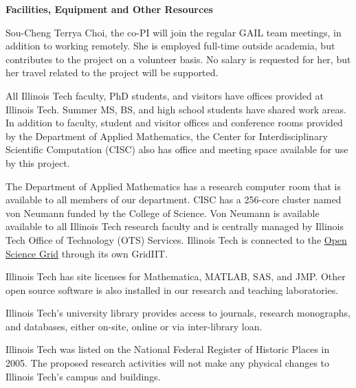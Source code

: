 \documentclass[11pt]{NSFamsart}
\begin{document}

\centerline{\textbf{\Large Facilities, Equipment and Other Resources}}

\bigskip

Sou-Cheng Terrya Choi, the co-PI will join the regular GAIL team meetings, in addition to working 
remotely.  She is employed full-time outside academia, but contributes to the project on a volunteer 
basis.  No salary is requested for her, but her travel related to the project will be supported.

All Illinois Tech faculty, PhD students, and visitors have offices provided at Illinois Tech.  Summer 
MS, BS, and high school students have shared work areas.  In addition to faculty, student and visitor 
offices and conference rooms provided by the Department of Applied Mathematics, the Center for 
Interdisciplinary Scientific Computation (CISC) also has office and meeting space available for use 
by this project.

The Department of Applied Mathematics has a research computer room that is available to all 
members of our department.  CISC has a 256-core cluster named von Neumann funded by the 
College of Science.  Von Neumann is 
available available to all Illinois Tech research faculty and is
centrally managed by Illinois Tech Office of Technology (OTS) Services.  Illinois Tech is connected 
to the \href{https://www.opensciencegrid.org}{Open Science Grid} through its own GridIIT.  

Illinois Tech has site licenses for Mathematica, MATLAB, SAS, and JMP.  Other open source 
software is also installed in our research and teaching laboratories.

Illinois Tech's university library provides access to journals, research monographs, and 
databases, either on-site, online or via inter-library loan.

Illinois Tech was listed on the National Federal Register of Historic Places in 2005. The proposed 
research activities will not make any physical changes to Illinois Tech's campus and buildings.
\end{document}
